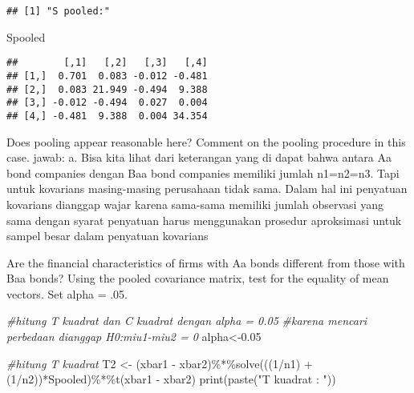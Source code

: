 \documentclass[
]{article}
\newenvironment{Shaded}{\begin{snugshade}}{\end{snugshade}}
\newcommand{\CommentTok}[1]{\textcolor[rgb]{0.56,0.35,0.01}{\textit{#1}}}
\newcommand{\DecValTok}[1]{\textcolor[rgb]{0.00,0.00,0.81}{#1}}
\newcommand{\FloatTok}[1]{\textcolor[rgb]{0.00,0.00,0.81}{#1}}
\newcommand{\FunctionTok}[1]{\textcolor[rgb]{0.00,0.00,0.00}{#1}}
\newcommand{\NormalTok}[1]{#1}
\newcommand{\OtherTok}[1]{\textcolor[rgb]{0.56,0.35,0.01}{#1}}
\newcommand{\SpecialCharTok}[1]{\textcolor[rgb]{0.00,0.00,0.00}{#1}}
\newcommand{\StringTok}[1]{\textcolor[rgb]{0.31,0.60,0.02}{#1}}
\begin{document}
\begin{verbatim}
## [1] "S pooled:"
\end{verbatim}

\begin{Shaded}
\begin{Highlighting}[]
\NormalTok{Spooled}
\end{Highlighting}
\end{Shaded}

\begin{verbatim}
##        [,1]   [,2]   [,3]   [,4]
## [1,]  0.701  0.083 -0.012 -0.481
## [2,]  0.083 21.949 -0.494  9.388
## [3,] -0.012 -0.494  0.027  0.004
## [4,] -0.481  9.388  0.004 34.354
\end{verbatim}

Does pooling appear reasonable here? Comment on the pooling procedure in
this case. jawab: a. Bisa kita lihat dari keterangan yang di dapat bahwa
antara Aa bond companies dengan Baa bond companies memiliki jumlah
n1=n2=n3. Tapi untuk kovarians masing-masing perusahaan tidak sama.
Dalam hal ini penyatuan kovarians dianggap wajar karena sama-sama
memiliki jumlah observasi yang sama dengan syarat penyatuan harus
menggunakan prosedur aproksimasi untuk sampel besar dalam penyatuan
kovarians

Are the financial characteristics of firms with Aa bonds different from
those with Baa bonds? Using the pooled covariance matrix, test for the
equality of mean vectors. Set alpha = .05.

\begin{Shaded}
\begin{Highlighting}[]
\CommentTok{\#hitung T kuadrat dan C kuadrat dengan alpha = 0.05}
\CommentTok{\#karena mencari perbedaan dianggap H0:miu1{-}miu2 = 0}
\NormalTok{alpha}\OtherTok{\textless{}{-}}\FloatTok{0.05}

\CommentTok{\#hitung T kuadrat}
\NormalTok{T2 }\OtherTok{\textless{}{-}}\NormalTok{ (xbar1 }\SpecialCharTok{{-}}\NormalTok{ xbar2)}\SpecialCharTok{\%*\%}\FunctionTok{solve}\NormalTok{(((}\DecValTok{1}\SpecialCharTok{/}\NormalTok{n1) }\SpecialCharTok{+}\NormalTok{ (}\DecValTok{1}\SpecialCharTok{/}\NormalTok{n2))}\SpecialCharTok{*}\NormalTok{Spooled)}\SpecialCharTok{\%*\%}\FunctionTok{t}\NormalTok{(xbar1 }\SpecialCharTok{{-}}\NormalTok{ xbar2)}
\FunctionTok{print}\NormalTok{(}\FunctionTok{paste}\NormalTok{(}\StringTok{"T kuadrat : "}\NormalTok{))}
\end{Highlighting}
\end{Shaded}
\end{document}
